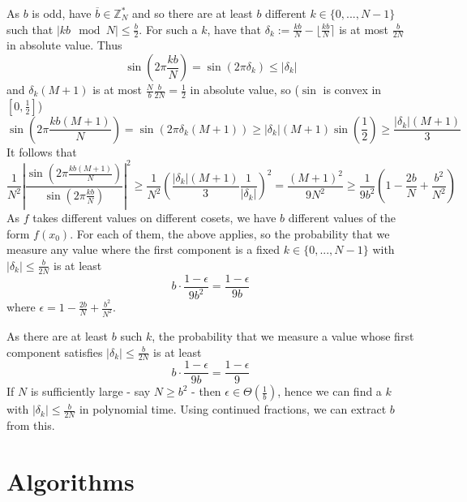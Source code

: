 \documentclass{scrartcl}
\newcommand{\Z}{\mathbb{Z}}
\begin{document}
As $b$ is odd, have $\overline{b} \in \Z_N^*$ and so there are at least $b$ different $k \in \{0, ..., N - 1\}$ such that $|kb \mod N| \leq \frac b 2$.
For such a $k$, have that $\delta_k := \frac {kb} {N} - \lfloor \frac {kb} {N} \rceil$ is at most $\frac b {2N}$ in absolute value.
Thus
\begin{equation*}
    \sin\left(2\pi \frac{kb} N\right) = \sin(2\pi\delta_k) \leq |\delta_k|
\end{equation*}
and $\delta_k (M + 1)$ is at most $\frac N b \frac b {2N} = \frac 1 2$ in absolute value, so ($\sin$ is convex in $[0, \frac 1 2]$)
\begin{equation*}
    \sin\left(2\pi \frac{kb(M + 1)} N\right) = \sin(2\pi\delta_k(M + 1)) \geq |\delta_k| (M + 1) \sin\left(\frac 1 2\right) \geq \frac {|\delta_k|(M + 1)} 3
\end{equation*}
It follows that
\begin{equation*}
    \frac 1 {N^2} \left| \frac {\sin(2\pi \frac {kb(M+1)} N)} {\sin(2\pi \frac {kb} N)} \right|^2 \geq \frac 1 {N^2} \left( \frac {|\delta_k| (M + 1)} 3 \frac 1 {|\delta_k|} \right)^2 = \frac {(M + 1)^2} {9N^2} \geq \frac 1 {9b^2} \left(1 - \frac {2b} N + \frac {b^2} {N^2}\right)
\end{equation*}
As $f$ takes different values on different cosets, we have $b$ different values of the form $f(x_0)$. 
For each of them, the above applies, so the probability that we measure any value where the first component is a fixed $k \in \{ 0, ..., N - 1\}$ with $|\delta_k| \leq \frac b {2N}$ is at least
\begin{equation*}
    b \cdot \frac {1 - \epsilon} {9b^2} = \frac {1 - \epsilon} {9b}
\end{equation*}
where $\epsilon = 1 - \frac {2b} N + \frac {b^2} {N^2}$.

As there are at least $b$ such $k$, the probability that we measure a value whose first component satisfies $|\delta_k| \leq \frac b {2N}$ is at least
\begin{equation*}
    b \cdot \frac {1 - \epsilon} {9b} = \frac {1 - \epsilon} 9
\end{equation*}
If $N$ is sufficiently large - say $N \geq b^2$ - then $\epsilon \in \Theta(\frac 1 b)$, hence we can find a $k$ with $|\delta_k| \leq \frac b {2N}$ in polynomial time.
Using continued fractions, we can extract $b$ from this.

\section{Algorithms}
\end{document}
